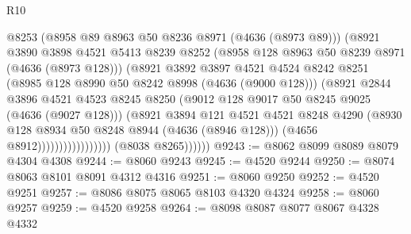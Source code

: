 \begin{lexlean}{R10}
\begin{coremodule}
                                      @8253
                                      (@8958 @89 @8963 @50 @8236 @8971 (@4636 (@8973 @89)))
                                      (@8921
                                        @3890
                                        @3898
                                        @4521
                                        @5413
                                        @8239
                                        @8252
                                        (@8958 @128 @8963 @50 @8239 @8971 (@4636 (@8973 @128)))
                                        (@8921
                                          @3892
                                          @3897
                                          @4521
                                          @4524
                                          @8242
                                          @8251
                                          (@8985 @128 @8990 @50 @8242 @8998 (@4636 (@9000 @128)))
                                          (@8921
                                            @2844
                                            @3896
                                            @4521
                                            @4523
                                            @8245
                                            @8250
                                            (@9012 @128 @9017 @50 @8245 @9025 (@4636 (@9027 @128)))
                                            (@8921
                                              @3894
                                              @121
                                              @4521
                                              @4521
                                              @8248
                                              @4290
                                              (@8930
                                                @128
                                                @8934
                                                @50
                                                @8248
                                                @8944
                                                (@4636 (@8946 @128)))
                                              (@4656 @8912)))))))))))))))))
              (@8038 @8265))))))
@9243 := @8062 @8099 @8089 @8079 @4304 @4308
@9244 := @8060 @9243
@9245 := @4520 @9244
@9250 := @8074 @8063 @8101 @8091 @4312 @4316
@9251 := @8060 @9250
@9252 := @4520 @9251
@9257 := @8086 @8075 @8065 @8103 @4320 @4324
@9258 := @8060 @9257
@9259 := @4520 @9258
@9264 := @8098 @8087 @8077 @8067 @4328 @4332

\end{coremodule}
\end{lexlean}
